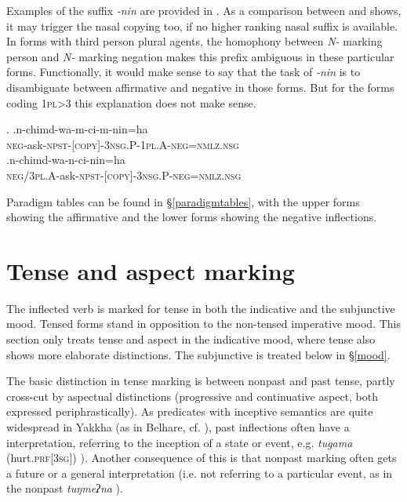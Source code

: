 	
Examples of the suffix \emph{-nin} are provided in \Next. As a comparison between \Next[a] and \Next[b] shows, it may trigger the nasal copying too, if no higher ranking nasal suffix is available. In forms with third person plural agents, the homophony between \emph{N-} marking person and \emph{N-} marking negation makes this prefix ambiguous in these particular forms. Functionally, it would make sense to say that the task of \emph{-nin} is to disambiguate between affirmative and negative in those forms. But for the forms coding {\scshape 1pl>3} this explanation does not make sense. 
 
 \ex. \ag.n-chimd-wa-m-ci-m-nin=ha\\
			{\scshape neg-}ask{\scshape -npst-[copy]-3nsg.P-1pl.A-neg=nmlz.nsg}\\
 	\bg.n-chimd-wa-n-ci-nin=ha\\
		{\scshape neg/3pl.A-}ask{\scshape -npst-[copy]-3nsg.P-neg=nmlz.nsg}\\
		
Paradigm tables can be found in §\ref{paradigmtables}, with the upper forms showing the affirmative and the lower forms showing the negative inflections. 	


\section{Tense and aspect marking }\label{tense}

The inflected verb is marked  for tense in both the indicative and the subjunctive mood. Tensed forms stand in opposition to the non-tensed imperative mood. This section only treats tense and aspect in the indicative mood, where tense also shows more elaborate distinctions. The subjunctive is treated below in §\ref{mood}.

The basic distinction in tense marking is between nonpast and past tense, partly cross-cut by aspectual distinctions (progressive and continuative aspect, both expressed periphrastically). As predicates with inceptive semantics are quite wide\-spread in Yakkha (as in Belhare, cf. \citealt{Bickel1996Aspect}), past inflections often have a  interpretation, referring to the inception of a state or event, e.g. \emph{tugama}  (hurt.{\scshape prf[3sg]}) ). Another consequence of this is that nonpast marking often gets a future  or a general interpretation (i.e. not referring to a particular event, as in  the nonpast \emph{tuŋmeʔna} ). 

